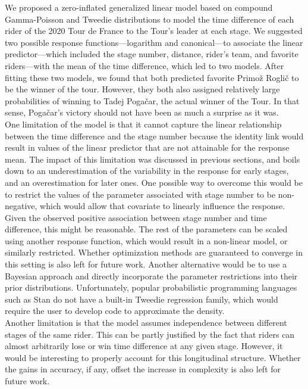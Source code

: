 \documentclass[aos,preprint]{imsart}
\begin{document}
We proposed a zero-inflated generalized linear model based on compound Gamma-Poisson and Tweedie distributions to model the time difference of each rider of the 2020 Tour de France to the Tour's leader at each stage. We suggested two possible response functions---logarithm and canonical---to associate the linear predictor---which included the stage number, distance, rider's team, and favorite riders---with the mean of the time difference, which led to two models. After fitting these two models, we found that both predicted favorite Primož Roglič to be the winner of the tour. However, they both also assigned relatively large probabilities of winning to Tadej Pogačar, the actual winner of the Tour. In that sense, Pogačar's victory should not have been as much a surprise as it was. \\


One limitation of the model is that it cannot capture the linear relationship between the time difference and the stage number because the identity link would result in values of the linear predictor that are not attainable for the response mean. The impact of this limitation was discussed in previous sections, and boils down to an underestimation of the variability in the response for early stages, and an overestimation for later ones. One possible way to overcome this would be to restrict the values of the parameter associated with stage number to be non-negative, which would allow that covariate to linearly influence the response. Given the observed positive association between stage number and time difference, this might be reasonable. The rest of the parameters can be scaled using another response function, which would result in a non-linear model, or similarly restricted. Whether optimization methods are guaranteed to converge in this setting is also left for future work. Another alternative would be to use a Bayesian approach and directly incorporate the parameter restrictions into their prior distributions. Unfortunately, popular probabilistic programming languages such as \textsf{Stan} do not have a built-in Tweedie regression family, which would require the user to develop code to approximate the density. \\


Another limitation is that the model assumes independence between different stages of the same rider. This can be partly justified by the fact that riders can almost arbitrarily lose or win time difference at any given stage. However, it would be interesting to properly account for this longitudinal structure. Whether the gains in accuracy, if any, offset the increase in complexity is also left for future work. \\
\end{document}
